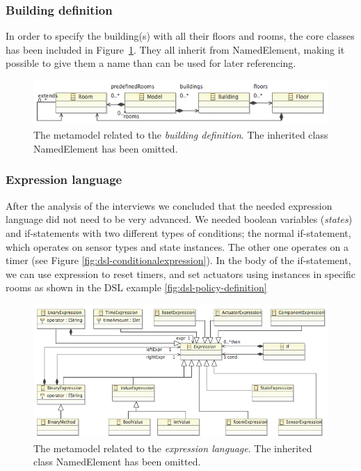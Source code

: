 \subsubsection{Building definition}
In order to specify the building(s) with all their floors and rooms, the core classes has been included in Figure \ref{fig:ecore-building-definition}. They all inherit from NamedElement, making it possible to give them a name than can be used for later referencing.
\begin{figure}[h]
  \centering \includegraphics[scale=.5]{ecore-building-definition.png}  
	\caption{The metamodel related to the \textit{building definition}. The inherited class NamedElement has been omitted.}
	\label{fig:ecore-building-definition}
\end{figure}

\subsubsection{Expression language}
After the analysis of the interviews we concluded that the needed expression language did not need to be very advanced. We needed boolean variables (\textit{states}) and if-statements with two different types of conditions; the normal if-statement, which operates on sensor types and state instances. The other one operates on a timer (see Figure \ref{fig:dsl-conditionalexpression}). In the body of the if-statement, we can use expression to reset timers, and set actuators using instances in specific rooms as shown in the DSL example \ref{fig:dsl-policy-definition}

\begin{figure}[h]
  \centering
    \includegraphics[scale=.5]{ecore-expression-language.png} 
	\caption{The metamodel related to the \textit{expression language}. The inherited class NamedElement has been omitted.}
	\label{fig:ecore-expression-language}
\end{figure}

